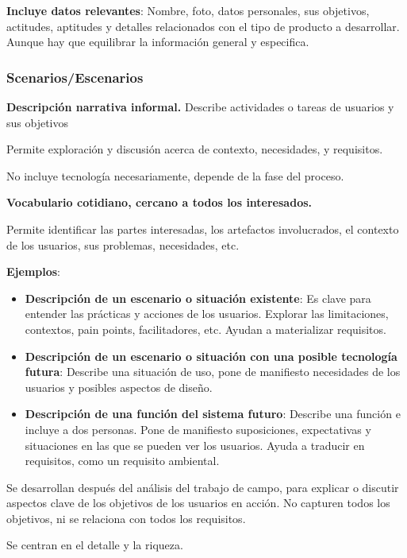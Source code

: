 \textbf{Incluye datos relevantes}: Nombre, foto, datos personales, sus
objetivos, actitudes, aptitudes y detalles relacionados con el tipo de
producto a desarrollar. Aunque hay que equilibrar la información general
y especifica.

\hypertarget{scenariosescenarios}{%
\subsubsection{Scenarios/Escenarios}\label{scenariosescenarios}}

\textbf{Descripción narrativa informal.} Describe actividades o tareas
de usuarios y sus objetivos

Permite exploración y discusión acerca de contexto, necesidades, y
requisitos.

No incluye tecnología necesariamente, depende de la fase del proceso.

\textbf{Vocabulario cotidiano, cercano a todos los interesados.}

Permite identificar las partes interesadas, los artefactos involucrados,
el contexto de los usuarios, sus problemas, necesidades, etc.

\textbf{Ejemplos}:

\begin{itemize}
\tightlist
\item
  \textbf{Descripción de un escenario o situación existente}: Es clave
  para entender las prácticas y acciones de los usuarios. Explorar las
  limitaciones, contextos, pain points, facilitadores, etc. Ayudan a
  materializar requisitos.
\item
  \textbf{Descripción de un escenario o situación con una posible
  tecnología futura}: Describe una situación de uso, pone de manifiesto
  necesidades de los usuarios y posibles aspectos de diseño.
\item
  \textbf{Descripción de una función del sistema futuro}: Describe una
  función e incluye a dos personas. Pone de manifiesto suposiciones,
  expectativas y situaciones en las que se pueden ver los usuarios.
  Ayuda a traducir en requisitos, como un requisito ambiental.
\end{itemize}

Se desarrollan después del análisis del trabajo de campo, para explicar
o discutir aspectos clave de los objetivos de los usuarios en acción. No
capturen todos los objetivos, ni se relaciona con todos los requisitos.

Se centran en el detalle y la riqueza.

